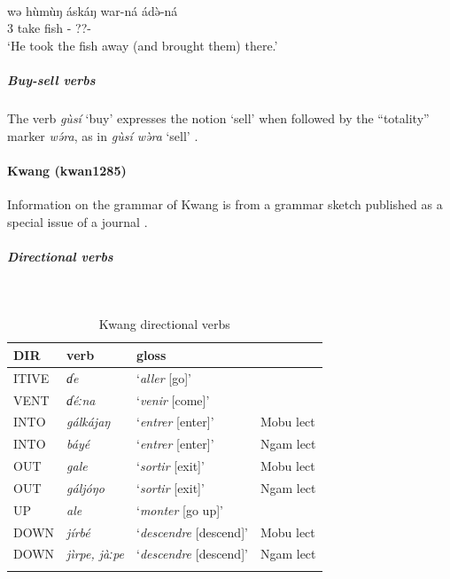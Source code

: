 \ea\label{ex2:kera10}
 \\
\gll wə hùmùŋ áskáŋ war-ná ádə̀-ná	\\
3 take fish - ??-	\\
\glt `He took the fish away (and brought them) there.' 
\z 

\subparagraph{Buy-sell verbs}

The verb \textit{gùsí} `buy' expresses the notion `sell' when followed by the ``totality'' marker \textit{wə́ra}, as in \textit{gùsí wə̀ra} `sell' \citep[53]{ebertSpracheUndTradition1976}. 

\paragraph*{Kwang (kwan1285)} \label{kwan}

Information on the grammar of Kwang is from a grammar sketch published as a special issue of a journal \citep{lenssenStudienVerbIm1984}. 

\largerpage
\subparagraph{Directional verbs}~

\begin{table}[H]
	\caption{Kwang directional verbs} 
	\label{tab:kwanV}
	\begin{tabular}{llll} %
		\lsptoprule
		DIR & verb & gloss &  \\ %
		\midrule
		ITIVE & \textit{ɗe} & `\textit{aller} [go]' & \\
		VENT & \textit{ɗéːna} & `\textit{venir} [come]' & \\
		INTO& \textit{gálkájaŋ} & `\textit{entrer} [enter]' & Mobu lect \\
		INTO& \textit{báyé} & `\textit{entrer} [enter]' & Ngam lect \\
		OUT & \textit{gale} & `\textit{sortir} [exit]' & Mobu lect \\
		OUT & \textit{gáljóŋo} & `\textit{sortir} [exit]' & Ngam lect \\
		UP & \textit{ale} & `\textit{monter} [go up]' &  \\
		DOWN & \textit{jírbé} & `\textit{descendre} [descend]' & Mobu lect \\
		DOWN & \textit{jìrpe, jàːpe} & `\textit{descendre} [descend]' & Ngam lect \\
		\lspbottomrule
	\end{tabular}
\end{table}

